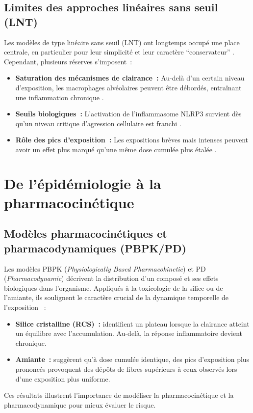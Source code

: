 \subsection{Limites des approches linéaires sans seuil (LNT)}
Les modèles de type linéaire sans seuil (LNT) ont longtemps occupé une place centrale, en particulier pour leur simplicité et leur caractère ``conservateur'' \citep{Belkebir2011,Simmons2005}. Cependant, plusieurs réserves s’imposent :
\begin{itemize}
	\item \textbf{Saturation des mécanismes de clairance :} Au-delà d’un certain niveau d’exposition, les macrophages alvéolaires peuvent être débordés, entraînant une inflammation chronique \citep{Tran2001,DeStefano2017}.
	\item \textbf{Seuils biologiques :} L’activation de l’inflammasome NLRP3 survient dès qu’un niveau critique d’agression cellulaire est franchi \citep{Groslambert2018,Sayan2016}.
	\item \textbf{Rôle des pics d’exposition :} Les expositions brèves mais intenses peuvent avoir un effet plus marqué qu’une même dose cumulée plus étalée \citep{Cox2019}.
\end{itemize}


\section{De l’épidémiologie à la pharmacocinétique}
\subsection{Modèles pharmacocinétiques et pharmacodynamiques (PBPK/PD)}
Les modèles PBPK (\emph{Physiologically Based Pharmacokinetic}) et PD (\emph{Pharmacodynamic}) décrivent la distribution d’un composé et ses effets biologiques dans l’organisme. Appliqués à la toxicologie de la silice ou de l’amiante, ils soulignent le caractère crucial de la dynamique temporelle de l’exposition \citep{Tran2001,DeStefano2017} :
\begin{itemize}
	\item \textbf{Silice cristalline (RCS) :} \citet{Tran2001} identifient un plateau lorsque la clairance atteint un équilibre avec l’accumulation. Au-delà, la réponse inflammatoire devient chronique.
	\item \textbf{Amiante :} \citet{DeStefano2017} suggèrent qu’à dose cumulée identique, des pics d’exposition plus prononcés provoquent des dépôts de fibres supérieurs à ceux observés lors d’une exposition plus uniforme.
\end{itemize}
Ces résultats illustrent l’importance de modéliser la pharmacocinétique et la pharmacodynamique pour mieux évaluer le risque.

